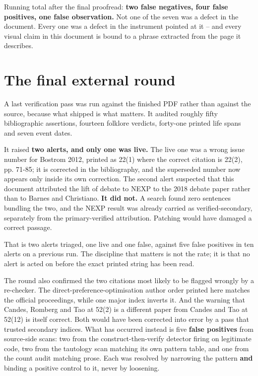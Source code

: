 Running total after the final proofread: \textbf{two false negatives, four false positives, one false observation.} Not one of the seven was a defect in the document. Every one was a defect in the instrument pointed at it -- and every visual claim in this document is bound to a phrase extracted from the page it describes.

\section*{The final external round}

A last verification pass was run against the finished PDF rather than against the source, because what shipped is what matters. It audited roughly fifty bibliographic assertions, fourteen folklore verdicts, forty-one printed life spans and seven event dates.

It raised \textbf{two alerts, and only one was live.} The live one was a wrong issue number for Bostrom 2012, printed as 22(1) where the correct citation is 22(2), pp. 71-85; it is corrected in the bibliography, and the superseded number now appears only inside its own correction. The second alert suspected that this document attributed the lift of debate to NEXP to the 2018 debate paper rather than to Barnes and Christiano. \textbf{It did not.} A search found zero sentences bundling the two, and the NEXP result was already carried as verified-secondary, separately from the primary-verified attribution. Patching would have damaged a correct passage.

That is two alerts triaged, one live and one false, against five false positives in ten alerts on a previous run. The discipline that matters is not the rate; it is that no alert is acted on before the exact printed string has been read.

The round also confirmed the two citations most likely to be flagged wrongly by a re-checker. The direct-preference-optimisation author order printed here matches the official proceedings, while one major index inverts it. And the warning that Candes, Romberg and Tao at 52(2) is a different paper from Candes and Tao at 52(12) is itself correct. Both would have been corrected into error by a pass that trusted secondary indices. What has occurred instead is five \textbf{false positives} from source-side scans: two from the construct-then-verify detector firing on legitimate code, two from the tautology scan matching its own pattern table, and one from the count audit matching prose. Each was resolved by narrowing the pattern \textbf{and} binding a positive control to it, never by loosening.


